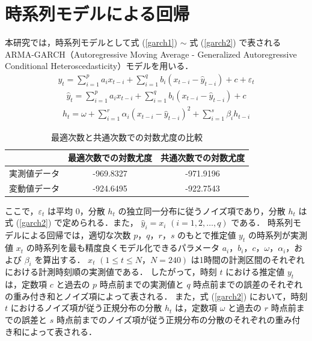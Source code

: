 \documentclass[technicalreport]{ieicej}
\begin{document}
\section{時系列モデルによる回帰}
本研究では，時系列モデルとして式 (\ref{garch1}) $\sim$ 式 (\ref{garch2}) で表される ARMA-GARCH（Autoregressive Moving Average - Generalized Autoregressive Conditional Heteroscedasticity）モデル\cite{lamoureux1990persistence}を用いる．
\begin{eqnarray}
y_t = \sum_{i=1}^p a_i x_{t-i} + \sum_{i=1}^q b_i (x_{t-i} - \widehat{y}_{t-i}) + c + \varepsilon_{t} 
\label{garch1}
\end{eqnarray}
\begin{eqnarray}
\widehat{y}_t = \sum_{i=1}^p a_i x_{t-i} + \sum_{i=1}^q b_i (x_{t-i} - \widehat{y}_{t-i}) + c
\end{eqnarray}
\begin{eqnarray}
\displaystyle h_{t} = \omega + \sum_{i=1}^{r}\alpha_i(x_{t-i} - \widehat{y}_{t-i})^2 + \sum_{i=1}^{s}\beta_ih_{t-i}
\label{garch2}
\end{eqnarray}
\begin{table}[b]
\centering
\caption{最適次数と共通次数での対数尤度の比較}
\label{more-param}
\begin{tabular}{|l|c|c|}
\hline
&最適次数での対数尤度&共通次数での対数尤度\\
\hline
実測値データ&-969.8327&-971.9196\\
\hline
変動値データ&-924.6495&-922.7543\\
\hline
\end{tabular}
\end{table}
ここで，$\varepsilon_t$ は平均 0，分散 $h_t$ の独立同一分布に従うノイズ項であり，分散 $h_t$ は式 (\ref{garch2}) で定められる．また， $\widehat{y}_i = x_i$ $(i = 1,2,\ldots,q)$ である．
時系列モデルによる回帰では，適切な次数 $p，q，r，s$ のもとで推定値 $y_t$ の時系列が実測値 $x_t$ の時系列を最も精度良くモデル化できるパラメータ $a_i，b_i，c，\omega，\alpha_i，$および $\beta_i$ を算出する．
$x_t$ $(1\leq t\leq N，N=240)$ は1時間の計測区間のそれぞれにおける計測時刻順の実測値である．
したがって，時刻 $t$ における推定値 $y_t$ は，定数項 $c$ と過去の $p$ 時点前までの実測値と $q$ 時点前までの誤差のそれぞれの重み付き和とノイズ項によって表される．
また，式 (\ref{garch2}) において，時刻 $t$ におけるノイズ項が従う正規分布の分散 $h_t$ は，定数項 $\omega$ と過去の $r$ 時点前までの誤差と $s$ 時点前までのノイズ項が従う正規分布の分散のそれぞれの重み付き和によって表される．
\end{document}
